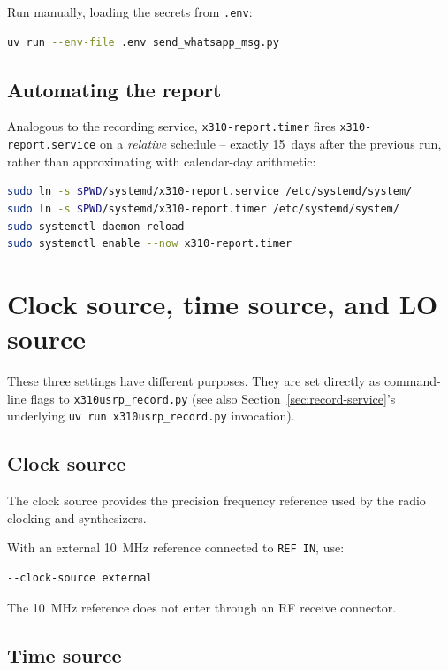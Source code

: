 \documentclass[11pt,a4paper]{article}
\begin{document}
Run manually, loading the secrets from \texttt{.env}:

\begin{lstlisting}[language=bash]
uv run --env-file .env send_whatsapp_msg.py
\end{lstlisting}

\subsection{Automating the report}

Analogous to the recording service, \texttt{x310-report.timer} fires \texttt{x310-report.service} on a \emph{relative} schedule -- exactly 15~days after the previous run, rather than approximating with calendar-day arithmetic:

\begin{lstlisting}[language=bash]
sudo ln -s $PWD/systemd/x310-report.service /etc/systemd/system/
sudo ln -s $PWD/systemd/x310-report.timer /etc/systemd/system/
sudo systemctl daemon-reload
sudo systemctl enable --now x310-report.timer
\end{lstlisting}

\section{Clock source, time source, and LO source}

These three settings have different purposes. They are set directly as command-line flags to \texttt{x310usrp\_record.py} (see also Section~\ref{sec:record-service}'s underlying \texttt{uv run x310usrp\_record.py} invocation).

\subsection{Clock source}

The clock source provides the precision frequency reference used by the radio clocking and synthesizers.

With an external 10~MHz reference connected to \texttt{REF IN}, use:

\begin{lstlisting}[language=bash]
--clock-source external
\end{lstlisting}

The 10~MHz reference does not enter through an RF receive connector.

\subsection{Time source}
\end{document}
